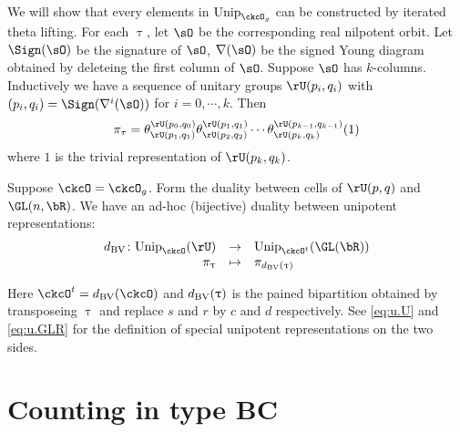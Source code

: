 \documentclass[12pt,a4paper]{amsart}
\def\DD{\nabla}
\numberwithin{equation}{section}
\theoremstyle{remark}
\def\Unip{\mathrm{Unip}}
\begin{document}
We will show that every elements in $\Unip_{\ckcO_g}$ can be constructed by iterated theta lifting.  
For each $\uptau$, let $\sO$ be the corresponding real nilpotent orbit. Let
$\Sign(\sO)$ be the signature of $\sO$, $\DD(\sO)$ be the signed Young diagram
obtained by deleteing the first column of $\sO$. 
Suppose $\sO$ has $k$-columns. Inductively we have a sequence of unitary groups
$\rU(p_i,q_i)$ with $(p_i,q_i) = \Sign(\DD^i(\sO))$ for $i=0, \cdots, k$. Then 
\begin{equation}\label{eq:u.U}
  \pi_\tau = \theta^{\rU(p_0,q_0)}_{\rU(p_1,q_1)} \theta^{\rU(p_1,q_1)}_{\rU(p_2,q_2)}\cdots   
\theta^{\rU(p_{k-1},q_{k-1})}_{\rU(p_k,q_k)}(1)
\end{equation}
where $1$ is the trivial representation of $\rU(p_k,q_k)$. 


Suppose $\ckcO = \ckcO_g$. Form the duality between cells of $\rU(p,q)$ and
$\GL(n,\bR)$. We have an ad-hoc (bijective) duality between unipotent
representations: 
\[
  \begin{array}{rcl}
 \dBV\colon \Unip_{\ckcO}(\rU)& \rightarrow &\Unip_{\ckcO^t}(\GL(\bR)) \\
 \pi_\uptau &\mapsto& \pi_{\dBV(\uptau)} \\ 
  \end{array}
\]

Here $\ckcO^t = \dBV(\ckcO)$ and $d_{\mathrm{BV}}(\uptau)$ is the pained bipartition
obtained by transposeing $\uptau$ and replace $s$ and $r$ by $c$ and $d$
respectively. See \eqref{eq:u.U} and \eqref{eq:u.GLR} for the definition of
special unipotent representations on the two sides.  

\section{Counting in type BC}
\end{document}
